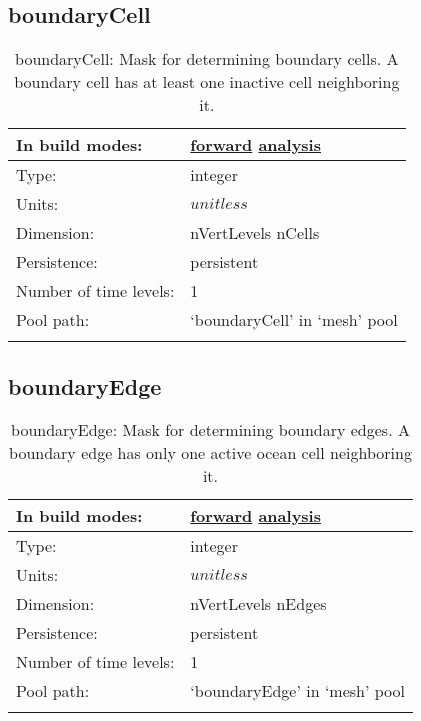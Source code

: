 \subsection[boundaryCell]{boundaryCell}
\label{subsec:var_sec_mesh_boundaryCell}
\begin{center}
\begin{longtable}{| p{2.0in} | p{4.0in} |}
        \hline 
        In build modes: & \hyperref[subsec:forward_var_tab_mesh]{forward} \hyperref[subsec:analysis_var_tab_mesh]{analysis} \\
        \hline 
        Type: & integer \\
        \hline 
        Units: & $unitless$ \\
        \hline 
        Dimension: & nVertLevels nCells \\
        \hline 
        Persistence: & persistent \\
        \hline 
        Number of time levels: & 1 \\
        \hline 
            Pool path: & `boundaryCell' in `mesh' pool \\
		 \hline 
    \caption{boundaryCell: Mask for determining boundary cells. A boundary cell has at least one inactive cell neighboring it.}
\end{longtable}
\end{center}
\subsection[boundaryEdge]{boundaryEdge}
\label{subsec:var_sec_mesh_boundaryEdge}
\begin{center}
\begin{longtable}{| p{2.0in} | p{4.0in} |}
        \hline 
        In build modes: & \hyperref[subsec:forward_var_tab_mesh]{forward} \hyperref[subsec:analysis_var_tab_mesh]{analysis} \\
        \hline 
        Type: & integer \\
        \hline 
        Units: & $unitless$ \\
        \hline 
        Dimension: & nVertLevels nEdges \\
        \hline 
        Persistence: & persistent \\
        \hline 
        Number of time levels: & 1 \\
        \hline 
            Pool path: & `boundaryEdge' in `mesh' pool \\
		 \hline 
    \caption{boundaryEdge: Mask for determining boundary edges. A boundary edge has only one active ocean cell neighboring it.}
\end{longtable}
\end{center}
